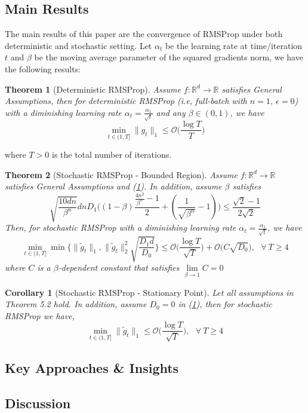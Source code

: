 \documentclass{article}
\newtheorem{theorem}{Theorem}[section]
\newtheorem{corollary}{Corollary}[section]
\begin{document}
\subsection{Main Results}
The main results of this paper are the convergence of RMSProp under both deterministic and stochastic setting. Let $\alpha_t$  be the learning rate at time/iteration $t$ and $\beta$ be the moving average parameter of the squared gradients norm, we have the following results: 
\begin{theorem}[Deterministic RMSProp]
Assume $f:\mathbb{R}^d \rightarrow \mathbb{R}$ satisfies General Assumptions, then for deterministic RMSProp (i.e, full-batch with $n = 1$, $\epsilon = 0$) with a diminishing learning rate $\alpha_t = \frac{\alpha_1}{\sqrt{t}}$ and any $\beta \in (0, 1)$, we have
\[
\min_{t \in (1, T]} \|g_t\|_1 \leq \mathcal{O}\Big(\frac{\log T}{T}\Big)
\]
\end{theorem}
where $T > 0$ is the total number of iterations.
\begin{theorem}[Stochastic RMSProp - Bounded Region]
	Assume $f:\mathbb{R}^d \rightarrow \mathbb{R}$ satisfies General Assumptions and (\hyperref[eq51]{1}). In addition, assume $\beta$ satisfies
	\[
	\sqrt{\frac{10dn}{\beta^n}}dnD_1\Big((1 - \beta)\frac{\frac{4n^2}{\beta^n} - 1}{2} + (\frac{1}{\sqrt{\beta^n}}- 1)\Big)\leq \frac{\sqrt{2} - 1}{2\sqrt{2}}
	\]
	Then, for stochastic RMSProp with a diminishing learning rate $\alpha_t = \frac{\alpha_1}{\sqrt{t}}$, we have
	\[
	\min_{t \in (1, T]} \min\{\|\tilde{g}_t\|_1, \|\tilde{g}_t\|_2^2\sqrt{\frac{D_1d}{D_0}}\} \leq \mathcal{O}\Big(\frac{\log T}{\sqrt{T}}\Big) + \mathcal{O}\Big(C\sqrt{D_0}\Big), \ \ \ \forall \ T\geq 4
	\]
	where $C$ is a $\beta$-dependent constant that satisfies $\lim\limits_{\beta \rightarrow 1} C = 0$
\end{theorem}
\begin{corollary}[Stochastic RMSProp - Stationary Point]
	Let all assumptions in Theorem 5.2 hold. In addition, assume $D_0 = 0$ in (\hyperref[eq51]{1}), then for stochastic RMSProp we have,
\[
\min_{t \in (1, T]} \|\tilde{g}_t\|_1 \leq \mathcal{O}\Big(\frac{\log T}{\sqrt{T}}\Big), \ \ \ \forall \ T \geq 4
\]
\end{corollary}
\subsection{Key Approaches \& Insights}
\subsection{Discussion}
\newpage
\end{document}
